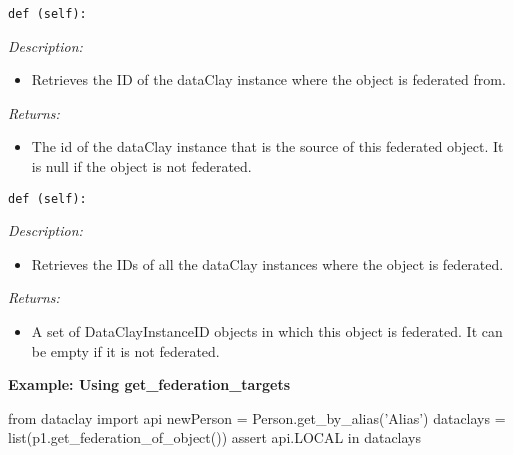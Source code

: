
\begin{dBox}
\texttt{def (self):}
\LINE

{\it Description:}

\begin{itemize}
 \item Retrieves the ID of the dataClay instance where the object is federated from. 
\end{itemize}

{\it Returns:}

\begin{itemize}
 \item The id of the dataClay instance that is the source of this federated object.  
 It is null if the object is not federated.
\end{itemize}

\end{dBox}


\begin{dBox}
\texttt{def (self):}
\LINE

{\it Description:}

\begin{itemize}
 \item Retrieves the IDs of all the dataClay instances where the object is federated. 
\end{itemize}

{\it Returns:}

\begin{itemize}
 \item A set of DataClayInstanceID objects in which this object is federated. 
 It can be empty if it is not federated.
\end{itemize}

\end{dBox}

\begin{tBox}
\textcolor{basecolor} {\bf Example: Using get\_federation\_targets}
\begin{python}
from dataclay import api
newPerson = Person.get_by_alias('Alias')
dataclays = list(p1.get_federation_of_object())
assert api.LOCAL in dataclays
\end{python}
\end{tBox}


